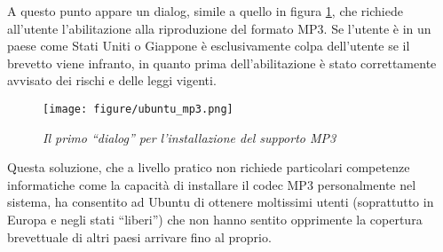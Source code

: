 A questo punto appare un dialog, simile a quello in figura \ref{dialog}, che richiede all'utente l'abilitazione alla riproduzione del formato MP3. Se l'utente è in un paese come Stati Uniti o Giappone è esclusivamente colpa dell'utente se il brevetto viene infranto, in quanto prima dell'abilitazione è stato correttamente avvisato dei rischi e delle leggi vigenti.

\begin{figure}[htb]
	\begin{center}
		\texttt{[image: figure/ubuntu\_mp3.png]}\label{dialog}
	\end{center}
	\caption{\textit{Il primo ``dialog'' per l'installazione del supporto MP3}}
\end{figure}

Questa soluzione, che a livello pratico non richiede particolari competenze informatiche come la capacità di installare il codec MP3 personalmente nel sistema, ha consentito ad Ubuntu di ottenere moltissimi utenti (soprattutto in Europa e negli stati ``liberi'') che non hanno sentito opprimente la copertura brevettuale di altri paesi arrivare fino al proprio.
